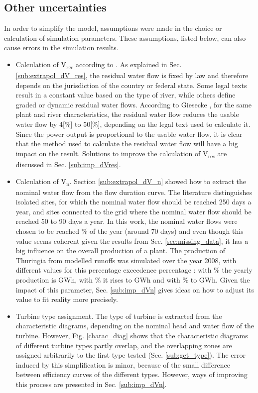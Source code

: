 \subsection{Other uncertainties}
\label{sub:limits_others}

In order to simplify the model, assumptions were made in the choice or calculation of simulation parameters. These assumptions, listed below, can also cause errors in the simulation results. 
\begin{itemize}
 \item Calculation of \.V\textsubscript{res} according to \cite{pacer}. As explained in Sec. \ref{sub:extrapol_dV_res}, the residual water flow is fixed by law and therefore depends on the jurisdiction of the country or federal state. Some legal texts result in a constant value based on the type of river, while others define graded or dynamic residual water flows. According to Giesecke \cite{gies_qrest}, for the same plant and river characteristics, the residual water flow reduces the usable water flow by \unit{4}[\%] to \unit{50}[\%], depending on the legal text used to calculate it. Since the power output is proportional to the usable water flow, it is clear that the method used to calculate the residual water flow will have a big impact on the result. Solutions to improve the calculation of \.V\textsubscript{res} are discussed in Sec. \ref{sub:imp_dVres}.
 \item Calculation of \.V\textsubscript{n}. Section \ref{sub:extrapol_dV_n} showed how to extract the nominal water flow from the flow duration curve. The literature distinguishes isolated sites, for which the nominal water flow should be reached 250 days a year, and sites connected to the grid where the nominal water flow should be reached 50 to 90 days a year. In this work, the nominal water flows were chosen to be reached \unit[20]{\%} of the year (around 70 days) and even though this value seems coherent given the results from Sec. \ref{sec:missing_data}, it has a big influence on the overall production of a plant. The production of Thuringia from modelled runoffs was simulated over the year 2008, with different values for this percentage exceedence percentage :  with \unit[20]{\%} the yearly production is \unit[187]{GWh}, with \unit[30]{\%} it rises to \unit[210]{GWh} and with \unit[40]{\%} to \unit[223]{GWh}. Given the impact of this parameter, Sec. \ref{sub:imp_dVn} gives ideas on how to adjust its value to fit reality more precisely.
 \item Turbine type assignment. The type of turbine is extracted from the characteristic diagrams, depending on the nominal head and water flow of the turbine. However, Fig. \ref{charac_diag} shows that the characteristic diagrams of different turbine types partly overlap, and the overlapping zones are assigned arbitrarily to the first type tested (Sec. \ref{sub:get_type}). The error induced by this simplification is minor, because of the small difference between efficiency curves of the different types. However, ways of improving this process are presented in Sec. \ref{sub:imp_dVn}.

\end{itemize}
